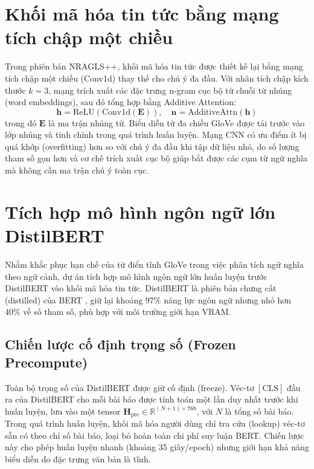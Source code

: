 \documentclass[../BTL.tex]{subfiles}
\begin{document}
\section{Khối mã hóa tin tức bằng mạng tích chập một chiều}

Trong phiên bản NRAGLS++, khối mã hóa tin tức được thiết kế lại bằng mạng tích chập một chiều (Conv1d) thay thế cho chú ý đa đầu. Với nhân tích chập kích thước $k=3$, mạng trích xuất các đặc trưng n-gram cục bộ từ chuỗi từ nhúng (word embeddings), sau đó tổng hợp bằng Additive Attention:
\begin{equation}
    \mathbf{h} = \text{ReLU}\!\left(\text{Conv1d}(\mathbf{E})\right), \quad \mathbf{n} = \text{AdditiveAttn}(\mathbf{h})
\end{equation}
trong đó $\mathbf{E}$ là ma trận nhúng từ. Biểu diễn từ đa chiều GloVe \cite{pennington2014glove} được tải trước vào lớp nhúng và tinh chỉnh trong quá trình huấn luyện. Mạng CNN có ưu điểm ít bị quá khớp (overfitting) hơn so với chú ý đa đầu khi tập dữ liệu nhỏ, do số lượng tham số gọn hơn và cơ chế trích xuất cục bộ giúp bắt được các cụm từ ngữ nghĩa mà không cần ma trận chú ý toàn cục.

\section{Tích hợp mô hình ngôn ngữ lớn DistilBERT}

Nhằm khắc phục hạn chế của từ điển tĩnh GloVe trong việc phân tích ngữ nghĩa theo ngữ cảnh, dự án tích hợp mô hình ngôn ngữ lớn huấn luyện trước DistilBERT \cite{sanh2019distilbert} vào khối mã hóa tin tức. DistilBERT là phiên bản chưng cất (distilled) của BERT \cite{devlin2019bert}, giữ lại khoảng 97\% năng lực ngôn ngữ nhưng nhỏ hơn 40\% về số tham số, phù hợp với môi trường giới hạn VRAM.

\subsection{Chiến lược cố định trọng số (Frozen Precompute)}

Toàn bộ trọng số của DistilBERT được giữ cố định (freeze). Véc-tơ $[\text{CLS}]$ đầu ra của DistilBERT cho mỗi bài báo được tính toán một lần duy nhất trước khi huấn luyện, lưu vào một tensor $\mathbf{H}_{\text{pre}} \in \mathbb{R}^{(N+1) \times 768}$, với $N$ là tổng số bài báo. Trong quá trình huấn luyện, khối mã hóa người dùng chỉ tra cứu (lookup) véc-tơ sẵn có theo chỉ số bài báo, loại bỏ hoàn toàn chi phí suy luận BERT. Chiến lược này cho phép huấn luyện nhanh (khoảng 35 giây/epoch) nhưng giới hạn khả năng biểu diễn do đặc trưng văn bản là tĩnh.
\end{document}
